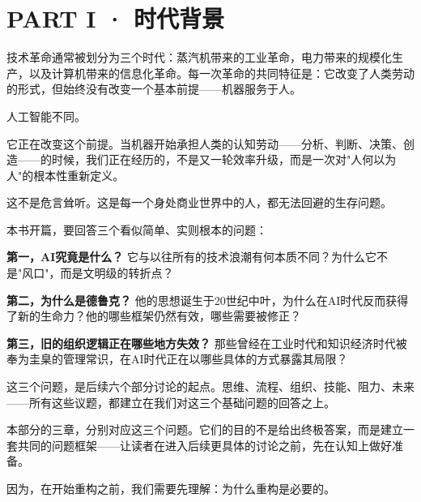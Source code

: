 \part{PART I · 时代背景}



技术革命通常被划分为三个时代：蒸汽机带来的工业革命，电力带来的规模化生产，以及计算机带来的信息化革命。每一次革命的共同特征是：它改变了人类劳动的形式，但始终没有改变一个基本前提——机器服务于人。

人工智能不同。

它正在改变这个前提。当机器开始承担人类的认知劳动——分析、判断、决策、创造——的时候，我们正在经历的，不是又一轮效率升级，而是一次对"人何以为人"的根本性重新定义。

这不是危言耸听。这是每一个身处商业世界中的人，都无法回避的生存问题。

本书开篇，要回答三个看似简单、实则根本的问题：

\textbf{第一，AI究竟是什么？} 它与以往所有的技术浪潮有何本质不同？为什么它不是"风口"，而是文明级的转折点？

\textbf{第二，为什么是德鲁克？} 他的思想诞生于20世纪中叶，为什么在AI时代反而获得了新的生命力？他的哪些框架仍然有效，哪些需要被修正？

\textbf{第三，旧的组织逻辑正在哪些地方失效？} 那些曾经在工业时代和知识经济时代被奉为圭臬的管理常识，在AI时代正在以哪些具体的方式暴露其局限？

这三个问题，是后续六个部分讨论的起点。思维、流程、组织、技能、阻力、未来——所有这些议题，都建立在我们对这三个基础问题的回答之上。

本部分的三章，分别对应这三个问题。它们的目的不是给出终极答案，而是建立一套共同的问题框架——让读者在进入后续更具体的讨论之前，先在认知上做好准备。

因为，在开始重构之前，我们需要先理解：为什么重构是必要的。
